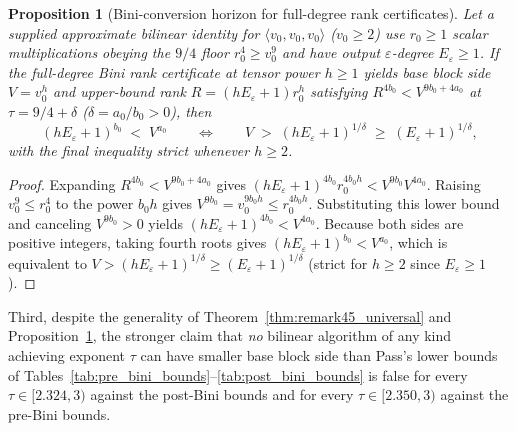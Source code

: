 \documentclass[11pt,a4paper]{article}
\theoremstyle{plain}
\newtheorem{proposition}[theorem]{Proposition}
\theoremstyle{definition}
\theoremstyle{remark}
\begin{document}
\begin{proposition}[Bini-conversion horizon for full-degree rank certificates]
\label{prop:general_bini_horizon}
Let a supplied approximate bilinear identity for $\langle v_0, v_0, v_0\rangle$ ($v_0 \ge 2$) use $r_0 \ge 1$ scalar multiplications obeying the $9/4$ floor $r_0^4 \ge v_0^9$ and have output $\varepsilon$-degree $E_\varepsilon \ge 1$. If the full-degree Bini rank certificate at tensor power $h \ge 1$ yields base block side $V = v_0^h$ and upper-bound rank $R = (h E_\varepsilon + 1) r_0^h$ satisfying $R^{4 b_0} < V^{9 b_0 + 4 a_0}$ at $\tau = 9/4 + \delta$ ($\delta = a_0/b_0 > 0$), then
\begin{equation}
    (h E_\varepsilon + 1)^{b_0} \;<\; V^{a_0} \qquad\Longleftrightarrow\qquad V \;>\; (h E_\varepsilon + 1)^{1/\delta} \;\ge\; (E_\varepsilon + 1)^{1/\delta} ,
    \label{eq:general_bini_horizon}
\end{equation}
with the final inequality strict whenever $h \ge 2$.
\end{proposition}
\begin{proof}
Expanding $R^{4 b_0} < V^{9 b_0 + 4 a_0}$ gives $(h E_\varepsilon + 1)^{4 b_0} r_0^{4 b_0 h} < V^{9 b_0} V^{4 a_0}$. Raising $v_0^9 \le r_0^4$ to the power $b_0 h$ gives $V^{9 b_0} = v_0^{9 b_0 h} \le r_0^{4 b_0 h}$. Substituting this lower bound and canceling $V^{9 b_0} > 0$ yields $(h E_\varepsilon + 1)^{4 b_0} < V^{4 a_0}$. Because both sides are positive integers, taking fourth roots gives $(h E_\varepsilon + 1)^{b_0} < V^{a_0}$, which is equivalent to $V > (h E_\varepsilon + 1)^{1/\delta} \ge (E_\varepsilon + 1)^{1/\delta}$ (strict for $h \ge 2$ since $E_\varepsilon \ge 1$).
\end{proof}

Third, despite the generality of Theorem~\ref{thm:remark45_universal} and Proposition~\ref{prop:general_bini_horizon}, the stronger claim that \emph{no} bilinear algorithm of any kind achieving exponent $\tau$ can have smaller base block side than Pass's lower bounds of Tables~\ref{tab:pre_bini_bounds}--\ref{tab:post_bini_bounds} is false for every $\tau \in [2.324, 3)$ against the post-Bini bounds and for every $\tau \in [2.350, 3)$ against the pre-Bini bounds.
\end{document}
